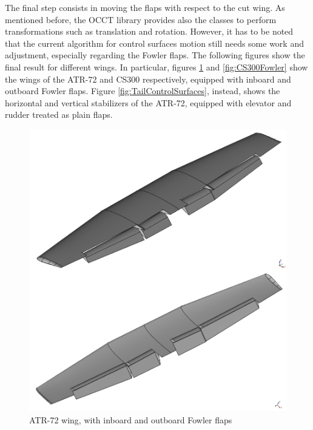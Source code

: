 \bigskip
\noindent
The final step consists in moving the flaps with respect to the cut wing. As mentioned before, the \gls{OCCT} library provides also the classes to perform transformations such as translation and rotation. However, it has to be noted that the current algorithm for control surfaces motion still needs some work and adjustment, especially regarding the Fowler flaps. The following figures show the final result for different wings. In particular, figures \ref{fig:ATR72Fowler} and \ref{fig:CS300Fowler} show the wings of the ATR-72 and CS300 respectively, equipped with inboard and outboard Fowler flaps. Figure \ref{fig:TailControlSurfaces}, instead, shows the horizontal and vertical stabilizers of the ATR-72, equipped with elevator and rudder treated as plain flaps.
%
\begin{figure}[H]
\centering
\includegraphics[scale=0.50]{Immagini/Appendice/Flap/flap_09}
\caption{ATR-72 wing, with inboard and outboard Fowler flaps}
\label{fig:ATR72Fowler}
\end{figure}
%
